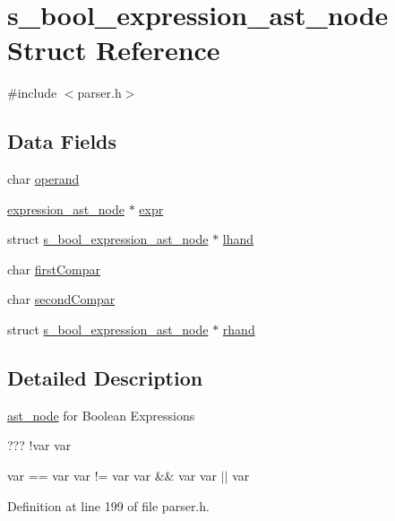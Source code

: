 \hypertarget{structs__bool__expression__ast__node}{\section{s\+\_\+bool\+\_\+expression\+\_\+ast\+\_\+node Struct Reference}
\label{structs__bool__expression__ast__node}
}


{\ttfamily \#include $<$parser.\+h$>$}

\subsection*{Data Fields}
\begin{DoxyCompactItemize}
\item 
char \hyperlink{structs__bool__expression__ast__node_a3cad0d01b06faaf8fa705cf1e62daaa1}{operand}
\item 
\hyperlink{parser_8h_a24e739ff40763d29ca9d4dab5b30819f}{expression\+\_\+ast\+\_\+node} $\ast$ \hyperlink{structs__bool__expression__ast__node_af0ee16005d665771829bfa0e2ec96040}{expr}
\item 
struct \hyperlink{structs__bool__expression__ast__node}{s\+\_\+bool\+\_\+expression\+\_\+ast\+\_\+node} $\ast$ \hyperlink{structs__bool__expression__ast__node_a44d04c0e6bd351e719a9efa5d645cf2e}{lhand}
\item 
char \hyperlink{structs__bool__expression__ast__node_a76587d626970df1f76752307a5f5f0e8}{first\+Compar}
\item 
char \hyperlink{structs__bool__expression__ast__node_a4813880de07470a452adcd2bfa41030c}{second\+Compar}
\item 
struct \hyperlink{structs__bool__expression__ast__node}{s\+\_\+bool\+\_\+expression\+\_\+ast\+\_\+node} $\ast$ \hyperlink{structs__bool__expression__ast__node_a9d7296fe1a405bcfbdaf3e898e18d819}{rhand}
\end{DoxyCompactItemize}


\subsection{Detailed Description}
\hyperlink{structast__node}{ast\+\_\+node} for Boolean Expressions

??? !var var

var == var var != var var \&\& var var $\vert$$\vert$ var 

Definition at line 199 of file parser.\+h.



